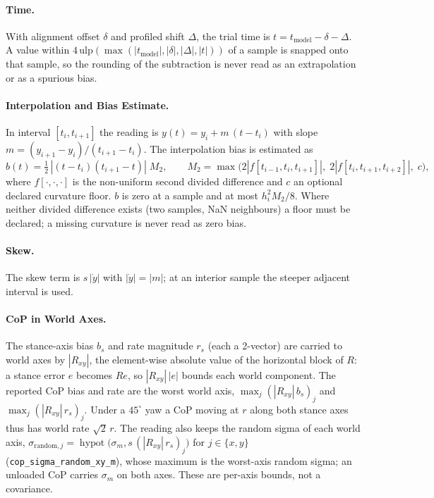 \documentclass[11pt]{article}
\begin{document}
\paragraph{Time.} With alignment offset $\delta$ and profiled shift
$\Delta$, the trial time is $t = t_{\mathrm{model}} - \delta - \Delta$. A
value within $4\,\mathrm{ulp}(\max(|t_{\mathrm{model}}|, |\delta|,
|\Delta|, |t|))$ of a sample is snapped onto that sample, so the rounding of
the subtraction is never read as an extrapolation or as a spurious bias.

\paragraph{Interpolation and Bias Estimate.} In interval
$[t_i, t_{i+1}]$ the reading is $y(t) = y_i + m\,(t - t_i)$ with slope
$m = (y_{i+1} - y_i)/(t_{i+1} - t_i)$. The interpolation bias is estimated
as
\begin{equation}
  b(t) = \tfrac12\,|(t - t_i)(t_{i+1} - t)|\;M_2,\qquad
  M_2 = \max\bigl(2|f[t_{i-1}, t_i, t_{i+1}]|,\;2|f[t_i, t_{i+1}, t_{i+2}]|,\;c\bigr),
\end{equation}
where $f[\cdot,\cdot,\cdot]$ is the non-uniform second divided difference
and $c$ an optional declared curvature floor. $b$ is zero at a sample and
at most $h_i^2 M_2/8$. Where neither divided difference exists (two
samples, NaN neighbours) a floor must be declared; a missing curvature is
never read as zero bias.

\paragraph{Skew.} The skew term is $s\,|\dot y|$ with $|\dot y| = |m|$; at
an interior sample the steeper adjacent interval is used.

\paragraph{CoP in World Axes.} The stance-axis bias $b_s$ and rate
magnitude $r_s$ (each a 2-vector) are carried to world axes by
$|R_{xy}|$, the element-wise absolute value of the horizontal block of
$R$: a stance error $e$ becomes $R e$, so $|R_{xy}|\,|e|$ bounds each world
component. The reported CoP bias and rate are the worst world axis,
$\max_j (|R_{xy}|\,b_s)_j$ and $\max_j (|R_{xy}|\,r_s)_j$. Under a $45^\circ$
yaw a CoP moving at $r$ along both stance axes thus has world rate
$\sqrt2\,r$. The reading also keeps the random sigma of each world axis,
$\sigma_{\mathrm{random},j} = \operatorname{hypot}\bigl(\sigma_m,
s\,(|R_{xy}|\,r_s)_j\bigr)$ for $j \in \{x, y\}$
(\texttt{cop\_sigma\_random\_xy\_m}), whose maximum is the worst-axis
random sigma; an unloaded CoP carries $\sigma_m$ on both axes. These are
per-axis bounds, not a covariance.
\end{document}
